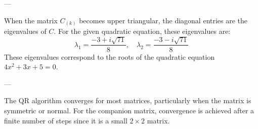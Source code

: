 \documentclass[journal]{IEEEtran}
\begin{document}
---


When the matrix \( C_{(k)} \) becomes upper triangular, the diagonal entries are the eigenvalues of \( C \). For the given quadratic equation, these eigenvalues are:
\[
\boxed{\lambda_1 = \frac{-3 + i\sqrt{71}}{8}, \quad \lambda_2 = \frac{-3 - i\sqrt{71}}{8}}
\]
These eigenvalues correspond to the roots of the quadratic equation \( 4x^2 + 3x + 5 = 0 \).

---


The QR algorithm converges for most matrices, particularly when the matrix is symmetric or normal. For the companion matrix, convergence is achieved after a finite number of steps since it is a small \( 2 \times 2 \) matrix.
\end{document}
